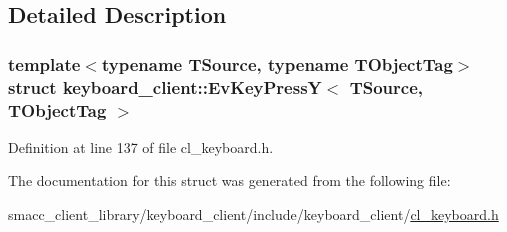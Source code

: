 \subsection{Detailed Description}
\subsubsection*{template$<$typename T\+Source, typename T\+Object\+Tag$>$\newline
struct keyboard\+\_\+client\+::\+Ev\+Key\+Press\+Y$<$ T\+Source, T\+Object\+Tag $>$}



Definition at line 137 of file cl\+\_\+keyboard.\+h.



The documentation for this struct was generated from the following file\+:\begin{DoxyCompactItemize}
\item 
smacc\+\_\+client\+\_\+library/keyboard\+\_\+client/include/keyboard\+\_\+client/\hyperlink{cl__keyboard_8h}{cl\+\_\+keyboard.\+h}\end{DoxyCompactItemize}
